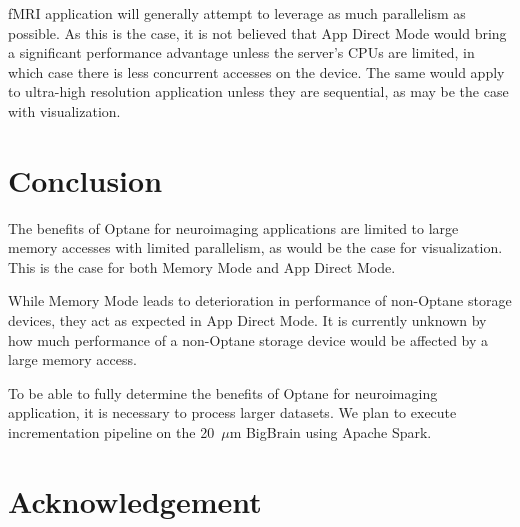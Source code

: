 \documentclass[conference]{IEEEtran}
\begin{document}
fMRI application will generally attempt to leverage as much parallelism as possible. As this
is the case, it is not believed that App Direct Mode would bring a significant performance advantage
unless the server's CPUs are limited, in which case there is less concurrent accesses on the device.
The same would apply to ultra-high resolution application unless they are sequential, as may be the case with
visualization.
\section{Conclusion}

The benefits of Optane for neuroimaging applications are limited to large memory
accesses with limited parallelism, as would be the case for visualization. This is
the case for both Memory Mode and App Direct Mode.

While Memory Mode leads to deterioration in performance of non-Optane storage devices,
they act as expected in App Direct Mode. It is currently unknown by how much performance
of a non-Optane storage device would be affected by a large memory access.

To be able to fully determine the benefits of Optane for neuroimaging application,
it is necessary to process larger datasets. We plan to execute incrementation pipeline on the 
20~$\mu$m BigBrain using Apache Spark. 
\section{Acknowledgement}
 

\end{document}
